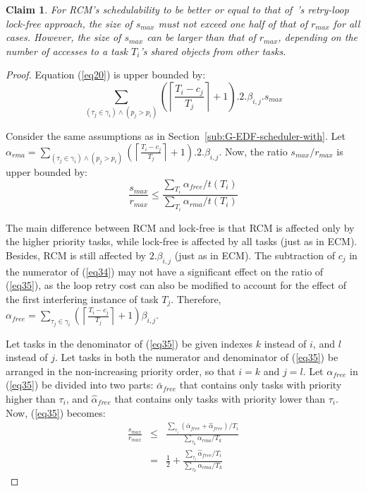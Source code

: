 \documentclass[letter]{sig-alternate}
\newtheorem{clm}{Claim}
\begin{document}
\begin{clm}
For RCM's schedulability to be better or equal to that of~\cite{key-5}'s retry-loop lock-free approach, the size of $s_{max}$ must not exceed one half of that of $r_{max}$ for all cases.
However, the size of $s_{max}$ can be larger than that of $r_{max}$, depending on the number of accesses to a task $T_i$'s shared objects from other tasks.
\end{clm}
\begin{proof}
Equation (\ref{eq20}) is upper bounded by:
 \begin{equation}
\sum_{\left(\tau_{j}\in\gamma_{i}\right)\wedge\left(p_{j}> p_{i}\right)}\left(\left\lceil\frac{T_{i}-c_{j}}{T_{j}}\right\rceil+1\right).2.\beta_{i,j}.s_{max}
\label{eq34}\end{equation}

Consider the same assumptions as in Section~\ref{sub:G-EDF-scheduler-with}.
Let $\alpha_{rma}=\sum_{\left(\tau_{j}\in\gamma_{i}\right)\wedge\left(p_{j}> p_{i}\right)}\left(\left\lceil\frac{T_{i}-c_{j}}{T_{j}}\right\rceil+1\right).2.\beta_{i,j}$. Now, the ratio $s_{max}/r_{max}$ is upper bounded by:
\begin{equation}
\frac{s_{max}}{r_{max}}\le\frac{\sum_{T_{i}}\alpha_{free}/t\left(T_{i}\right)}{\sum_{T_{i}}\alpha_{rma}/t\left(T_{i}\right)}
\label{eq35}\end{equation}

The main difference between RCM and lock-free is that RCM is affected only by the higher priority tasks, while lock-free is affected by all tasks (just as in ECM). 
Besides, RCM
is still affected by $2.\beta_{i,j}$ (just as in ECM).
The subtraction of $c_{j}$ in the numerator of (\ref{eq34}) may not
have a significant effect on the ratio of (\ref{eq35}), as the loop retry 
cost can also be modified to account for the effect of the first interfering
instance of task $T_{j}$. Therefore, 
$\alpha_{free} = \sum_{\tau_{j}\in\gamma_{i}}\left(\left\lceil\frac{T_{i}-c_j}{T_{j}}\right\rceil + 1 \right)\beta_{i,j}$.

Let tasks in the denominator of (\ref{eq35}) be given indexes $k$ instead of $i$, and $l$ instead of $j$. Let tasks in both the numerator and denominator of (\ref{eq35}) be arranged in the non-increasing priority order, so that $i=k$ and $j=l$. Let $\alpha_{free}$ in (\ref{eq35}) be divided into two parts: $\bar{\alpha}_{free}$ that contains only tasks with priority higher than $\tau_i$, and $\hat{\alpha}_{free}$ that contains only tasks with priority lower than $\tau_i$. Now, (\ref{eq35}) becomes:
\begin{eqnarray}
\frac{s_{max}}{r_{max}} & \le & \frac{\sum_{\tau_{i}}(\bar{\alpha}_{free}+\hat{\alpha}_{free})/T_{i}}{\sum_{\tau_{k}}\alpha_{rma}/T_{k}}\nonumber \\
 & = & \frac{1}{2}+\frac{\sum_{\tau_{i}}\hat{\alpha}_{free}/T_{i}}{\sum_{\tau_{k}}\alpha_{rma}/T_{k}}\label{eq36}\end{eqnarray}


\end{proof}
\end{document}
